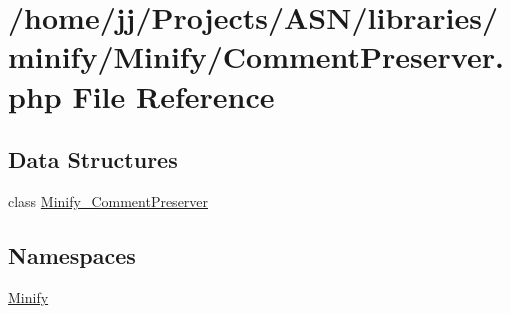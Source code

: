 \hypertarget{_comment_preserver_8php}{}\section{/home/jj/\+Projects/\+A\+S\+N/libraries/minify/\+Minify/\+Comment\+Preserver.php File Reference}
\label{_comment_preserver_8php}
\subsection*{Data Structures}
\begin{DoxyCompactItemize}
\item 
class \hyperlink{class_minify___comment_preserver}{Minify\+\_\+\+Comment\+Preserver}
\end{DoxyCompactItemize}
\subsection*{Namespaces}
\begin{DoxyCompactItemize}
\item 
 \hyperlink{namespace_minify}{Minify}
\end{DoxyCompactItemize}
